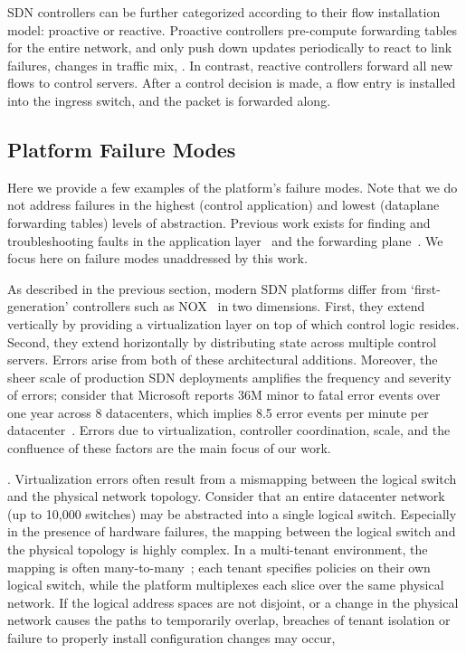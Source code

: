 SDN controllers can be further categorized according to their flow
installation model: proactive or reactive.
Proactive controllers pre-compute forwarding tables for the entire network,
and only push down updates periodically to react to link failures, changes in
traffic mix, \etc. In contrast, reactive controllers forward all new flows to
control servers. After a control decision is made, a flow entry is installed
into the ingress switch, and the packet is forwarded along.

\subsection{Platform Failure Modes}

Here we provide a few examples of the platform's failure modes. Note that
we do not address failures in the highest (control application) and lowest
(dataplane forwarding tables) levels of abstraction. Previous work exists
for finding and troubleshooting faults in the application layer~\cite{nice}
and the forwarding plane~\cite{anteater}. We focus here on failure modes unaddressed
by this work.

As described in the previous section, modern SDN platforms differ from
`first-generation' controllers such as NOX~\cite{nox} in two dimensions. 
First, they extend vertically by providing a virtualization layer on top of
which control logic resides. Second, they extend horizontally by
distributing state across multiple control servers. Errors arise from both of
these architectural additions. Moreover, the sheer scale of production
SDN deployments amplifies the
frequency and severity of errors; consider that Microsoft reports 36M 
minor to fatal error events over one year across 8 datacenters,
which implies 8.5 error events per minute per
datacenter~\cite{Greenberg:2009:VSF:1592568.1592576}. Errors due to virtualization,
controller coordination, scale, and the confluence of these factors are the main
focus of our work.

. Virtualization errors often result from a mismapping between the logical
switch and the physical network topology. Consider that an entire datacenter
network (up to 10,000 switches) may be abstracted into a single logical switch. Especially in the
presence of hardware failures, the mapping between the logical switch and the
physical topology is highly complex. In a multi-tenant environment, the mapping is often
many-to-many~\cite{Casado:2010:VNF:1921151.1921162}; each tenant specifies
policies on their own logical switch, while the platform multiplexes each
slice over the same physical network. If the logical address
spaces are not disjoint, or a change in the physical network causes the paths
to temporarily overlap, breaches of tenant isolation or failure to properly
install configuration changes may occur,

